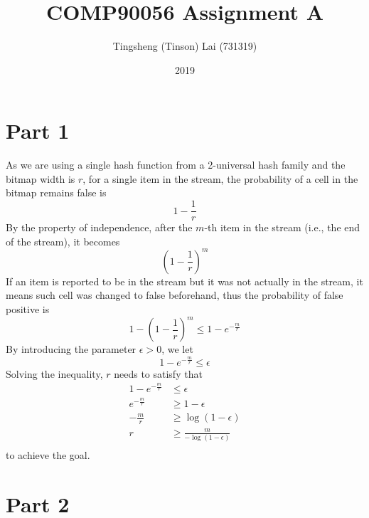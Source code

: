 \documentclass[a4paper]{article}
\title{\textbf{COMP90056 Assignment A}}
\author{Tingsheng (Tinson) Lai (731319)}
\date{2019}
\begin{document}
    \maketitle
    \section{Part 1}
        As we are using a single hash function from a 2-universal hash family and the bitmap width is $r$, for a single item in the stream, the probability of a cell in the bitmap remains false is
        $$1 - \frac{1}{r}$$
        By the property of independence, after the $m$-th item in the stream (i.e., the end of the stream), it becomes
        $$\left( 1 - \frac{1}{r} \right)^m$$
        If an item is reported to be in the stream but it was not actually in the stream, it means such cell was changed to false beforehand, thus the probability of false positive is
        $$1 - \left( 1 - \frac{1}{r} \right)^m \leq 1 - e^{-\frac{m}{r}}$$
        By introducing the parameter $\epsilon > 0$, we let
        $$1 - e^{-\frac{m}{r}} \leq \epsilon$$
        Solving the inequality, $r$ needs to satisfy that
        \begin{equation*}
            \begin{split}
                1 - e^{-\frac{m}{r}} & \leq \epsilon \\
                e^{-\frac{m}{r}} & \geq 1 - \epsilon \\
                -\frac{m}{r} & \geq \log{\left( 1 - \epsilon \right)} \\
                r & \geq \frac{m}{-\log\left( 1 - \epsilon \right)} \\
            \end{split}
        \end{equation*}
        to achieve the goal.
    \section{Part 2}
\end{document}
